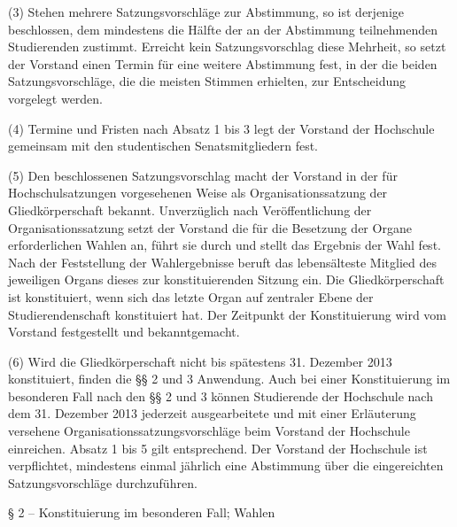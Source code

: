 \documentclass[
10pt,
a4paper,
twoside,								%
titlepage=false,							%
draft=false								%
]{scrartcl}
\begin{document}
(3) Stehen mehrere Satzungsvorschläge zur Abstimmung, so ist derjenige beschlossen, dem mindestens die Hälfte der an der Abstimmung teilnehmenden Studierenden zustimmt. Erreicht kein Satzungsvorschlag diese Mehrheit, so setzt der Vorstand einen Termin für eine weitere Abstimmung fest, in der die beiden Satzungsvorschläge, die die meisten Stimmen erhielten, zur Entscheidung vorgelegt werden.

(4) Termine und Fristen nach Absatz 1 bis 3 legt der Vorstand der Hochschule gemeinsam mit den studentischen Senatsmitgliedern fest.

(5) Den beschlossenen Satzungsvorschlag macht der Vorstand in der für Hochschulsatzungen vorgesehenen Weise als Organisationssatzung der Gliedkörperschaft bekannt. Unverzüglich nach Veröffentlichung der Organisationssatzung setzt der Vorstand die für die Besetzung der Organe erforderlichen Wahlen an, führt sie durch und stellt das Ergebnis der Wahl fest. Nach der Feststellung der Wahlergebnisse beruft das lebensälteste Mitglied des jeweiligen Organs dieses zur konstituierenden Sitzung ein. Die Gliedkörperschaft ist konstituiert, wenn sich das letzte Organ auf zentraler Ebene der Studierendenschaft konstituiert hat. Der Zeitpunkt der Konstituierung wird vom Vorstand festgestellt und bekanntgemacht.

(6) Wird die Gliedkörperschaft nicht bis spätestens 31. Dezember 2013 konstituiert, finden die §§ 2 und 3 Anwendung. Auch bei einer Konstituierung im besonderen Fall nach den §§ 2 und 3 können Studierende der Hochschule nach dem 31. Dezember 2013 jederzeit ausgearbeitete und mit einer Erläuterung versehene Organisationssatzungsvorschläge beim Vorstand der Hochschule einreichen. Absatz 1 bis 5 gilt entsprechend. Der Vorstand der Hochschule ist verpflichtet, mindestens einmal jährlich eine Abstimmung über die eingereichten Satzungsvorschläge durchzuführen.


§ 2 – Konstituierung im besonderen Fall; Wahlen
\end{document}
